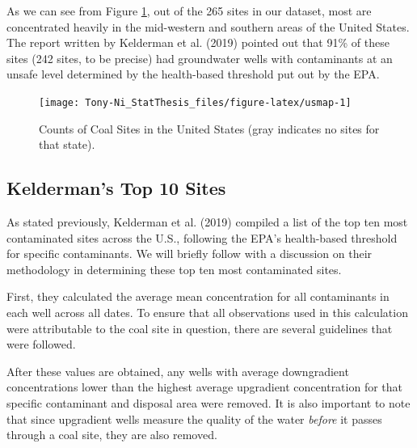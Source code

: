 \documentclass[12pt, twoside]{amherstthesis}
\begin{document}
As we can see from Figure \ref{fig:usmap}, out of the 265 sites in our dataset, most are concentrated heavily in the mid-western and southern areas of the United States. The report written by Kelderman et al. (2019) pointed out that 91\% of these sites (242 sites, to be precise) had groundwater wells with contaminants at an unsafe level determined by the health-based threshold put out by the EPA.
\begin{figure}

{\centering \texttt{[image: Tony-Ni\_StatThesis\_files/figure-latex/usmap-1]} 

}

\caption{Counts of Coal Sites in the United States (gray indicates no sites for that state).}\label{fig:usmap}
\end{figure}
\hypertarget{keldermans-top-10-sites}{%
\subsection{Kelderman's Top 10 Sites}\label{keldermans-top-10-sites}}

As stated previously, Kelderman et al. (2019) compiled a list of the top ten most contaminated sites across the U.S., following the EPA's health-based threshold for specific contaminants. We will briefly follow with a discussion on their methodology in determining these top ten most contaminated sites.

First, they calculated the average mean concentration for all contaminants in each well across all dates. To ensure that all observations used in this calculation were attributable to the coal site in question, there are several guidelines that were followed.

After these values are obtained, any wells with average downgradient concentrations lower than the highest average upgradient concentration for that specific contaminant and disposal area were removed. It is also important to note that since upgradient wells measure the quality of the water \emph{before} it passes through a coal site, they are also removed.
\end{document}
